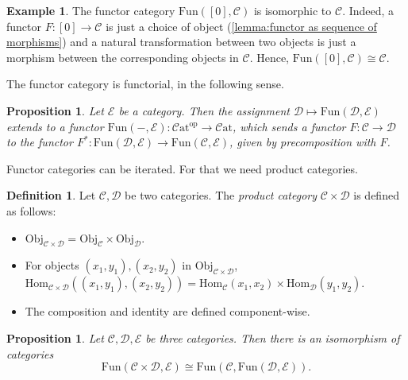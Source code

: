 \documentclass[11pt, a4paper]{amsart}
\newcommand{\cC}{\mathcal{C}}
\newcommand{\cD}{\mathcal{D}}
\newcommand{\cE}{\mathcal{E}}
\newcommand{\Hom}{\mathrm{Hom}}
\newcommand{\op}{\mathrm{op}}
\newcommand{\Fun}{\mathrm{Fun}}
\newcommand{\Cat}{\mathscr{C}\mathrm{at}}
\newcommand{\Obj}{\mathrm{Obj}}
\newtheorem{proposition}[equation]{Proposition}
\theoremstyle{definition}
\newtheorem{definition}[equation]{Definition}
\newtheorem{example}[equation]{Example}
\theoremstyle{remark}
\numberwithin{equation}{section}
\begin{document}
\begin{example} \label{ex:functor category from point}
  The functor category $\Fun([0],\cC)$ is isomorphic to $\cC$. Indeed, a functor $F\colon [0] \to \cC$ is just a choice of object (\cref{lemma:functor as sequence of morphisms}) and a natural transformation between two objects is just a morphism between the corresponding objects in $\cC$. Hence, $\Fun([0],\cC) \cong \cC$.
\end{example}

The functor category is functorial, in the following sense.

\begin{proposition} \label{prop:functor category functorial}
  Let $\cE$ be a category. Then the assignment $\cD \mapsto \Fun(\cD,\cE)$ extends to a functor $\Fun(-,\cE)\colon \Cat^{\op} \to \Cat$, which sends a functor $F\colon \cC \to \cD$ to the functor $F^*\colon \Fun(\cD,\cE) \to \Fun(\cC,\cE)$, given by precomposition with $F$.
\end{proposition}

Functor categories can be iterated. For that we need product categories.

\begin{definition} \label{def:product category}
  Let $\cC,\cD$ be two categories. The \emph{product category} $\cC \times \cD$ is defined as follows:
\begin{itemize}
    \item $\Obj_{\cC \times \cD} = \Obj_{\cC} \times \Obj_{\cD}$.
    \item For objects $(x_1,y_1),(x_2,y_2)$ in $\Obj_{\cC \times \cD}$, $\Hom_{\cC \times \cD}((x_1,y_1),(x_2,y_2)) = \Hom_{\cC}(x_1,x_2) \times \Hom_{\cD}(y_1,y_2)$.
    \item The composition and identity are defined component-wise.
\end{itemize}
\end{definition}

\begin{proposition} \label{prop:functor category as currying}
  Let $\cC,\cD,\cE$ be three categories. Then there is an isomorphism of categories
  \[
  \Fun(\cC \times \cD, \cE) \cong \Fun(\cC, \Fun(\cD,\cE)).
  \]
\end{proposition}
\end{document}
